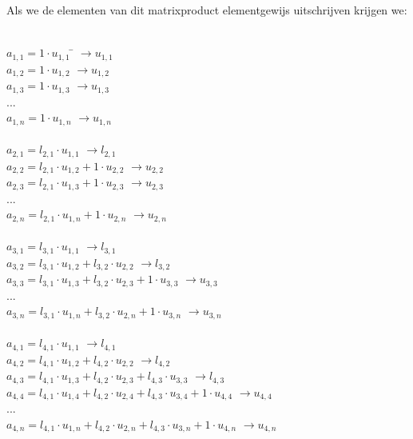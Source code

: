 \documentclass[a4paper]{article}
\begin{document}
\begin{minipage}[c]{\textwidth}
Als we de elementen van dit matrixproduct elementgewijs uitschrijven krijgen we:
\begin{tabbing} %
\\$a_{1,1} = 1 \cdot u_{1,1}$\hspace{6.0cm} \= $\rightarrow  u_{1,1}$
\\$a_{1,2} = 1 \cdot u_{1,2}$ \> $\rightarrow  u_{1,2}$
\\$a_{1,3} = 1 \cdot u_{1,3}$ \> $\rightarrow  u_{1,3}$
\\ {...}
\\$a_{1,n} = 1 \cdot u_{1,n}$ \> $\rightarrow  u_{1,n}$
\\ {}
\\$a_{2,1} = l_{2,1} \cdot u_{1,1}$ \> $\rightarrow l_{2,1}$
\\$a_{2,2} = l_{2,1} \cdot u_{1,2} + 1 \cdot u_{2,2}$ \> $\rightarrow u_{2,2}$
\\$a_{2,3} = l_{2,1} \cdot u_{1,3} + 1 \cdot u_{2,3}$ \> $\rightarrow u_{2,3}$
\\{...}
\\$a_{2,n} = l_{2,1} \cdot u_{1,n} + 1 \cdot u_{2,n}$ \> $\rightarrow u_{2,n}$
\\{}
\\$a_{3,1} = l_{3,1} \cdot u_{1,1}$ \> $\rightarrow l_{3,1}$
\\$a_{3,2} = l_{3,1} \cdot u_{1,2} +  l_{3,2} \cdot u_{2,2}$ \> $\rightarrow l_{3,2}$
\\$a_{3,3} = l_{3,1} \cdot u_{1,3} +  l_{3,2} \cdot u_{2,3} + 1 \cdot u_{3,3}$ \> $\rightarrow u_{3,3}$
\\{...}
\\$a_{3,n} = l_{3,1} \cdot u_{1,n} +  l_{3,2} \cdot u_{2,n} + 1 \cdot u_{3,n}$ \> $\rightarrow u_{3,n}$
\\{}
\\$a_{4,1} = l_{4,1} \cdot u_{1,1}$ \> $\rightarrow l_{4,1}$
\\$a_{4,2} = l_{4,1} \cdot u_{1,2} +  l_{4,2} \cdot u_{2,2}$ \> $\rightarrow l_{4,2}$
\\$a_{4,3} = l_{4,1} \cdot u_{1,3} +  l_{4,2} \cdot u_{2,3} + l_{4,3} \cdot u_{3,3}$ \> $\rightarrow l_{4,3}$
\\$a_{4,4} = l_{4,1} \cdot u_{1,4} +  l_{4,2} \cdot u_{2,4} + l_{4,3} \cdot u_{3,4} + 1 \cdot u_{4,4}$ \> $\rightarrow u_{4,4}$
\\{...}
\\$a_{4,n} = l_{4,1} \cdot u_{1,n} +  l_{4,2} \cdot u_{2,n} + l_{4,3} \cdot u_{3,n} + 1 \cdot u_{4,n}$ \> $\rightarrow u_{4,n}$
\\{}
\end{tabbing}
\end{minipage}
\end{document}
